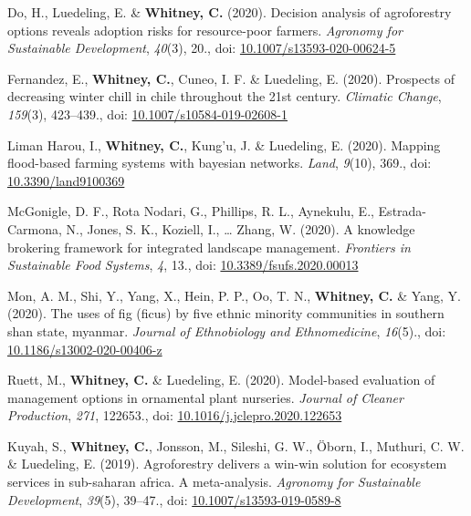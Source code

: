 \documentclass[11pt,a4paper,]{awesome-cv}
\newlength{\cslhangindent}
\newenvironment{CSLReferences}[2] %
 {\begin{list}{}{%
  \setlength{\itemindent}{0pt}
  \setlength{\leftmargin}{0pt}
  \setlength{\parsep}{0pt}
  \ifodd #1
   \setlength{\leftmargin}{\cslhangindent}
   \setlength{\itemindent}{-1\cslhangindent}
  \fi
  \setlength{\itemsep}{#2\baselineskip}}}
 {\end{list}}
\begin{document}
\begin{CSLReferences}{1}{0}
Do, H., Luedeling, E. \& \textbf{Whitney, C.} (2020). Decision analysis
of agroforestry options reveals adoption risks for resource-poor
farmers. \emph{Agronomy for Sustainable Development}, \emph{40}(3), 20.,
doi:
\href{https://doi.org/10.1007/s13593-020-00624-5}{10.1007/s13593-020-00624-5}

Fernandez, E., \textbf{Whitney, C.}, Cuneo, I. F. \& Luedeling, E.
(2020). Prospects of decreasing winter chill in chile throughout the
21st century. \emph{Climatic Change}, \emph{159}(3), 423--439., doi:
\href{https://doi.org/10.1007/s10584-019-02608-1}{10.1007/s10584-019-02608-1}

Liman Harou, I., \textbf{Whitney, C.}, Kung'u, J. \& Luedeling, E.
(2020). Mapping flood-based farming systems with bayesian networks.
\emph{Land}, \emph{9}(10), 369., doi:
\href{https://doi.org/10.3390/land9100369}{10.3390/land9100369}

McGonigle, D. F., Rota Nodari, G., Phillips, R. L., Aynekulu, E.,
Estrada-Carmona, N., Jones, S. K., Koziell, I., \ldots{} Zhang, W.
(2020). A knowledge brokering framework for integrated landscape
management. \emph{Frontiers in Sustainable Food Systems}, \emph{4}, 13.,
doi:
\href{https://doi.org/10.3389/fsufs.2020.00013}{10.3389/fsufs.2020.00013}

Mon, A. M., Shi, Y., Yang, X., Hein, P. P., Oo, T. N.,
\textbf{Whitney, C.} \& Yang, Y. (2020). The uses of fig (ficus) by five
ethnic minority communities in southern shan state, myanmar.
\emph{Journal of Ethnobiology and Ethnomedicine}, \emph{16}(5)., doi:
\href{https://doi.org/10.1186/s13002-020-00406-z}{10.1186/s13002-020-00406-z}

Ruett, M., \textbf{Whitney, C.} \& Luedeling, E. (2020). Model-based
evaluation of management options in ornamental plant nurseries.
\emph{Journal of Cleaner Production}, \emph{271}, 122653., doi:
\href{https://doi.org/10.1016/j.jclepro.2020.122653}{10.1016/j.jclepro.2020.122653}

Kuyah, S., \textbf{Whitney, C.}, Jonsson, M., Sileshi, G. W., Öborn, I.,
Muthuri, C. W. \& Luedeling, E. (2019). Agroforestry delivers a win-win
solution for ecosystem services in sub-saharan africa. A meta-analysis.
\emph{Agronomy for Sustainable Development}, \emph{39}(5), 39--47., doi:
\href{https://doi.org/10.1007/s13593-019-0589-8}{10.1007/s13593-019-0589-8}


\end{CSLReferences}
\end{document}
